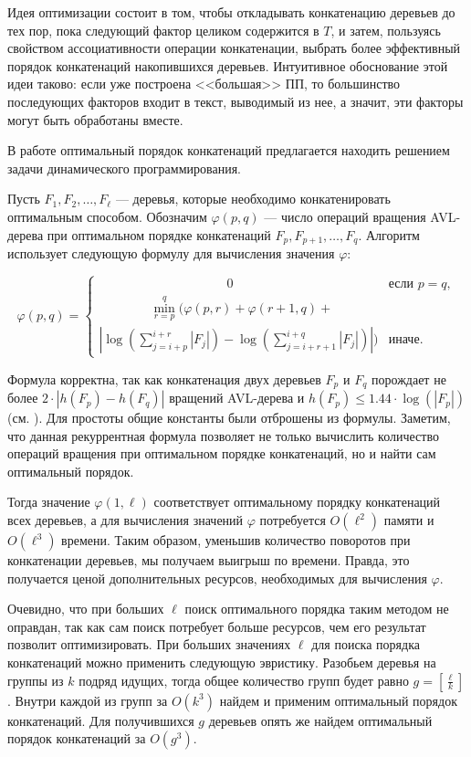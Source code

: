 \documentclass[14pt]{article}
\newcommand{\tuple}[4]{
    #1_{#2}, #1_{#3}, \dots, #1_{#4}
}
\begin{document}
Идея оптимизации \cite{OurPracticalTest} состоит в том, чтобы откладывать конкатенацию деревьев до тех пор, пока следующий фактор целиком содержится в $T$, и 
затем, пользуясь свойством ассоциативности операции конкатенации, выбрать более эффективный порядок конкатенаций накопившихся деревьев. 
Интуитивное обоснование этой идеи таково: если уже построена <<большая>> ПП, то большинство последующих
факторов входит в текст, выводимый из нее, а значит, эти факторы могут быть обработаны вместе.

В работе \cite{OurPracticalTest} оптимальный порядок конкатенаций предлагается находить решением задачи динамического программирования.

Пусть $\tuple{F}{1}{2}{\ell}$ --- деревья, которые необходимо конкатенировать оптимальным способом.
Обозначим $\varphi(p, q)$ --- число операций вращения AVL-дерева при оптимальном порядке конкатенаций
$\tuple{F}{p}{p+1}{q}$. Алгоритм использует следующую формулу для вычисления значения $\varphi$:

$$\varphi(p, q) = \begin{cases}
\qquad \qquad \qquad \qquad \qquad 0 &\text{если } p=q, \\
\qquad \qquad \min_{r = p}^q(\varphi(p, r) + \varphi(r+1, q) +&\\
\left|\log\left(\sum_{j=i+p}^{i+r}|F_j|\right) - \log\left(\sum_{j=i+r+1}^{i+q}|F_j|\right)\right|) &\mbox{иначе}.
\end{cases}$$

Формула корректна, так как конкатенация двух деревьев $F_p$ и $F_q$ порождает не более $2\cdot|h(F_p) -
h(F_q)|$ вращений AVL-дерева \cite{RytterSLPConstruction} и $h(F_p) \leq 1.44 \cdot \log(|F_p|)$ (см. \cite{Knuth}).
Для простоты общие константы были отброшены из формулы. Заметим, что данная рекуррентная формула позволяет
не только вычислить количество операций вращения при оптимальном порядке конкатенаций, но и найти сам оптимальный порядок.

Тогда значение $\varphi(1, \ell)$ соответствует оптимальному порядку конкатенаций всех деревьев, а для вычисления значений
$\varphi$ потребуется $O(\ell^2)$ памяти и $O(\ell^3)$ времени. Таким образом, уменьшив количество поворотов при конкатенации
деревьев, мы получаем выигрыш по времени. Правда, это получается ценой дополнительных ресурсов, необходимых для вычисления $\varphi$.

Очевидно, что при больших $\ell$ поиск оптимального порядка таким методом не оправдан, так как сам поиск потребует больше ресурсов, чем 
его результат позволит оптимизировать. %
При больших значениях $\ell$ для поиска порядка конкатенаций можно применить следующую эвристику. Разобьем деревья
на группы из $k$ подряд идущих, тогда общее количество групп будет равно $g = \left[\frac{\ell}{k}\right]$.
Внутри каждой из групп за $O(k^3)$ найдем и применим оптимальный порядок конкатенаций. Для получившихся $g$ деревьев
опять же найдем оптимальный порядок конкатенаций за $O(g^3)$.
\end{document}
